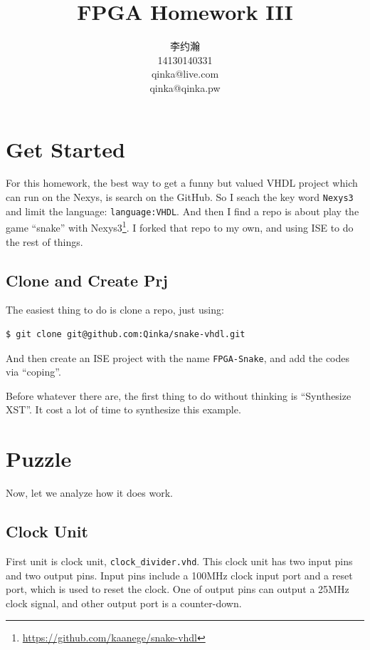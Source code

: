 \documentclass{article}
\title{FPGA Homework III}
\author{李约瀚 \\ 14130140331 \\ qinka@live.com \\ qinka@qinka.pw}
\begin{document}
    \maketitle
    \newpage
    \tableofcontents
    \newpage
    \section{Get Started}
    \label{sec:getstarted}
    
    For this homework, the best way to get a funny but valued VHDL project which can run on the Nexys, is search on the GitHub.
    So I seach the key word \verb|Nexys3| and limit the language: \lstinline|language:VHDL|.
    And then I find a repo is about play the game ``snake'' with Nexys3\footnote{\url{https://github.com/kaanege/snake-vhdl}}.
    I forked that repo to my own, and using ISE to do the rest of things.
    
    \subsection{Clone and Create Prj}
    \label{sec:cloneandcreateprj}
    
    The easiest thing to do is clone a repo, just using:
    \begin{lstlisting}
$ git clone git@github.com:Qinka/snake-vhdl.git
    \end{lstlisting}
    And then create an ISE project with the name \verb|FPGA-Snake|, and add the codes via ``coping''.
    
    Before whatever there are, the first thing to do without thinking is ``Synthesize XST''.
    It cost a lot of time to synthesize this example.
    
    \section{Puzzle}
    \label{sec:puzzle}
    
    Now, let we analyze how it does work.
    
    \subsection{Clock Unit}
    \label{sec:clockunit}

    First unit is clock unit, \verb|clock_divider.vhd|. This clock unit has two input pins and two output pins.
    Input pins include a 100MHz clock input port and a reset port, which is used to reset the clock.
    One of output pins can output a 25MHz clock signal, and other output port is a counter-down.
    
\end{document}
